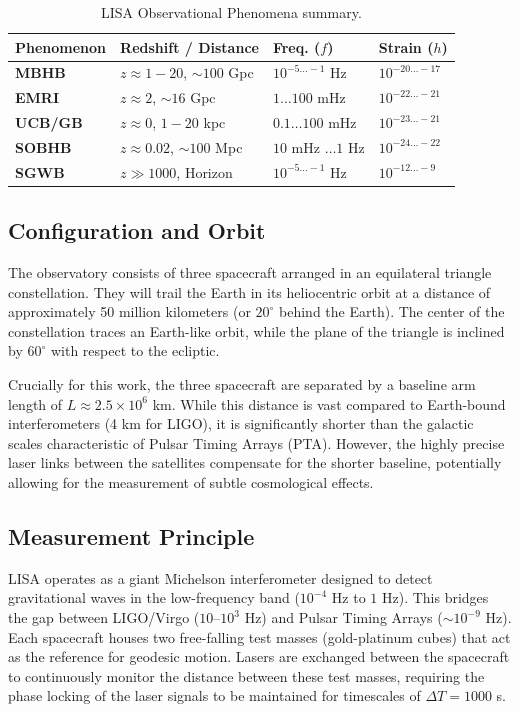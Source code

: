 \documentclass[twocolumn]{revtex4-2}
\begin{document}
\begin{table}[ht]
\centering
\scriptsize
\setlength{\tabcolsep}{2pt}
\begin{tabular}{llll}
\toprule
\textbf{Phenomenon} & \textbf{Redshift / Distance} & \textbf{Freq. ($f$)} & \textbf{Strain ($h$)} \\
\midrule
\textbf{MBHB} & $z \approx 1-20$, $\sim 100$ Gpc & $10^{-5 \dots -1}$ Hz & $10^{-20 \dots -17}$ \\
\addlinespace
\textbf{EMRI} & $z \approx 2$, $\sim 16$ Gpc & $1 \dots 100$ mHz & $10^{-22 \dots -21}$ \\
\addlinespace
\textbf{UCB/GB} & $z \approx 0$, $1-20$ kpc & $0.1 \dots 100$ mHz & $10^{-23 \dots -21}$ \\
\addlinespace
\textbf{SOBHB} & $z \approx 0.02$, $\sim 100$ Mpc & $10$ mHz $\dots 1$ Hz & $10^{-24 \dots -22}$ \\
\addlinespace
\textbf{SGWB} & $z \gg 1000$, Horizon & $10^{-5 \dots -1}$ Hz & $10^{-12 \dots -9}$ \\
\bottomrule
\end{tabular}
\caption{LISA Observational Phenomena summary\cite{AmaroSeoane2017}.}
\label{tab:lisa_summary}
\end{table}

\subsection{Configuration and Orbit}
The observatory consists of three spacecraft arranged in an equilateral triangle constellation. They will trail the Earth in its heliocentric orbit at a distance of approximately 50 million kilometers (or $20^\circ$ behind the Earth). The center of the constellation traces an Earth-like orbit, while the plane of the triangle is inclined by $60^\circ$ with respect to the ecliptic.

Crucially for this work, the three spacecraft are separated by a baseline arm length of $L \approx 2.5 \times 10^6$ km. While this distance is vast compared to Earth-bound interferometers (4 km for LIGO), it is significantly shorter than the galactic scales characteristic of Pulsar Timing Arrays (PTA). However, the highly precise laser links between the satellites compensate for the shorter baseline, potentially allowing for the measurement of subtle cosmological effects.

\subsection{Measurement Principle}
LISA operates as a giant Michelson interferometer designed to detect gravitational waves in the low-frequency band ($10^{-4}$ Hz to $1$ Hz). This bridges the gap between LIGO/Virgo ($10$--$10^3$ Hz) and Pulsar Timing Arrays ($\sim 10^{-9}$ Hz). Each spacecraft houses two free-falling test masses (gold-platinum cubes) that act as the reference for geodesic motion. Lasers are exchanged between the spacecraft to continuously monitor the distance between these test masses, requiring the phase locking of the laser signals to be maintained for timescales of $\Delta T=1000$ s.
\end{document}
